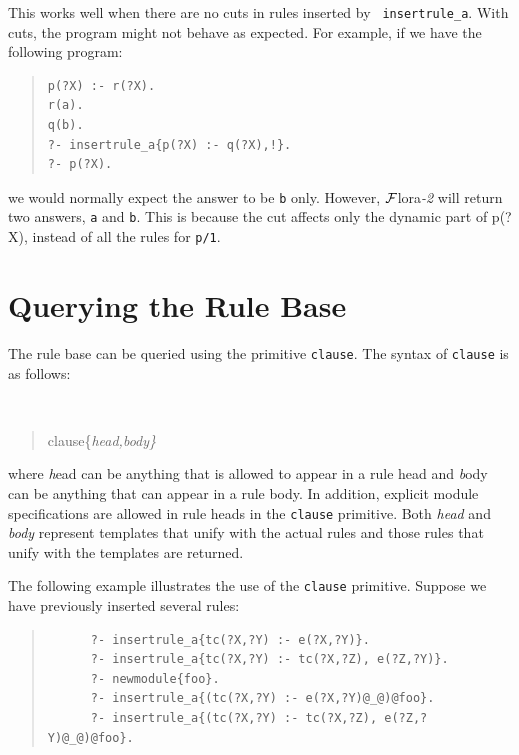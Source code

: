 \documentclass[11pt]{article}
\newcommand{\FLORA}{{\mbox{\sc ${\cal F}${lora}\rm\emph{-2}}}\xspace}
\begin{document}
This works well when there are no cuts in rules inserted by {\tt
  insertrule\_a}. With cuts, the program might not
behave as expected. For example, if we have the following program:
\begin{quote}
\begin{verbatim}
p(?X) :- r(?X).
r(a).
q(b).
?- insertrule_a{p(?X) :- q(?X),!}.
?- p(?X).
\end{verbatim}
\end{quote}
\noindent
we would normally expect the answer to be {\tt b} only. However, \FLORA will
return two answers, {\tt a} and {\tt b}. This is because the cut affects
only the dynamic part of p(?X), instead of all the rules for {\tt p/1}.

\section{Querying the Rule Base}
\label{sec:clause}

The rule base can be queried using the primitive {\tt clause}.  The
  syntax of {\tt clause} is as follows:

{\tt
\begin{quote}
clause\{\it{head,body}\}
\end{quote}
}
\noindent
where {\emph head} can be anything that is allowed to appear in a rule
head and {\emph body} can be anything that
can appear in a rule body. In addition, explicit module specifications are
allowed in rule heads in the {\tt clause} primitive. 
Both \emph{head} and \emph{body} represent
templates that unify with the actual rules and those rules that unify
with the templates are returned.

The following example illustrates the use of the {\tt clause} primitive.
Suppose we have previously inserted several rules:
\begin{quote}
\begin{verbatim}
      ?- insertrule_a{tc(?X,?Y) :- e(?X,?Y)}.
      ?- insertrule_a{tc(?X,?Y) :- tc(?X,?Z), e(?Z,?Y)}.
      ?- newmodule{foo}.
      ?- insertrule_a{(tc(?X,?Y) :- e(?X,?Y)@_@)@foo}.
      ?- insertrule_a{(tc(?X,?Y) :- tc(?X,?Z), e(?Z,?Y)@_@)@foo}.
\end{verbatim}
\end{quote}
\end{document}
